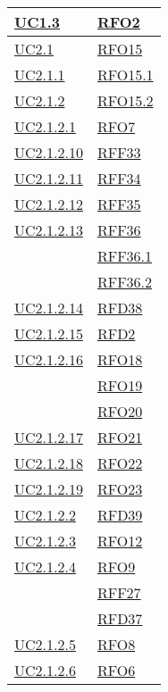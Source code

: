 \begin{longtable}{|>{\centering}m{5cm}|m{5cm}<{\centering}|}
	\hyperlink{UC1.3}{UC1.3} & \hyperlink{RFO2}{RFO2}\\ \hline
	\hyperlink{UC2.1}{UC2.1} & \hyperlink{RFO15}{RFO15}\\ \hline
	\hyperlink{UC2.1.1}{UC2.1.1} & \hyperlink{RFO15.1}{RFO15.1}\\ \hline
	\hyperlink{UC2.1.2}{UC2.1.2} & \hyperlink{RFO15.2}{RFO15.2}\\ \hline
	\hyperlink{UC2.1.2.1}{UC2.1.2.1} & \hyperlink{RFO7}{RFO7}\\ \hline
	\hyperlink{UC2.1.2.10}{UC2.1.2.10} & \hyperlink{RFF33}{RFF33}\\ \hline
	\hyperlink{UC2.1.2.11}{UC2.1.2.11} & \hyperlink{RFF34}{RFF34}\\ \hline
	\hyperlink{UC2.1.2.12}{UC2.1.2.12} & \hyperlink{RFF35}{RFF35}\\ \hline
	\hyperlink{UC2.1.2.13}{UC2.1.2.13} & \hyperlink{RFF36}{RFF36}\\
	& \hyperlink{RFF36.1}{RFF36.1}\\
	& \hyperlink{RFF36.2}{RFF36.2}\\ \hline
	\hyperlink{UC2.1.2.14}{UC2.1.2.14} & \hyperlink{RFD38}{RFD38}\\ \hline
	\hyperlink{UC2.1.2.15}{UC2.1.2.15} & \hyperlink{RFD2}{RFD2}\\ \hline
	\hyperlink{UC2.1.2.16}{UC2.1.2.16} & \hyperlink{RFO18}{RFO18}\\
	& \hyperlink{RFO19}{RFO19}\\
	& \hyperlink{RFO20}{RFO20}\\ \hline
	\hyperlink{UC2.1.2.17}{UC2.1.2.17} & \hyperlink{RFO21}{RFO21}\\ \hline
	\hyperlink{UC2.1.2.18}{UC2.1.2.18} & \hyperlink{RFO22}{RFO22}\\ \hline
	\hyperlink{UC2.1.2.19}{UC2.1.2.19} & \hyperlink{RFO23}{RFO23}\\ \hline
	\hyperlink{UC2.1.2.2}{UC2.1.2.2} & \hyperlink{RFD39}{RFD39}\\ \hline
	\hyperlink{UC2.1.2.3}{UC2.1.2.3} & \hyperlink{RFO12}{RFO12}\\ \hline
	\hyperlink{UC2.1.2.4}{UC2.1.2.4} & \hyperlink{RFO9}{RFO9}\\
	& \hyperlink{RFF27}{RFF27}\\
	& \hyperlink{RFD37}{RFD37}\\ \hline
	\hyperlink{UC2.1.2.5}{UC2.1.2.5} & \hyperlink{RFO8}{RFO8}\\ \hline
	\hyperlink{UC2.1.2.6}{UC2.1.2.6} & \hyperlink{RFO6}{RFO6}\\

\end{longtable}
